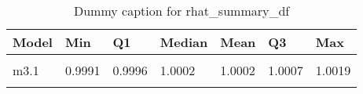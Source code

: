 \begin{table}
\centering
\caption{Dummy caption for rhat_summary_df}
\centering
\fontsize{10}{12}\selectfont
\begin{tabular}[t]{lllllll}
\toprule
Model & Min & Q1 & Median & Mean & Q3 & Max\\
\midrule
\cellcolor{gray!10}{m2} & \cellcolor{gray!10}{0.9991} & \cellcolor{gray!10}{1.0000} & \cellcolor{gray!10}{1.0003} & \cellcolor{gray!10}{1.0008} & \cellcolor{gray!10}{1.0013} & \cellcolor{gray!10}{1.0037}\\
m3.1 & 0.9991 & 0.9996 & 1.0002 & 1.0002 & 1.0007 & 1.0019\\
\cellcolor{gray!10}{m4} & \cellcolor{gray!10}{0.9992} & \cellcolor{gray!10}{0.9998} & \cellcolor{gray!10}{1.0005} & \cellcolor{gray!10}{1.0005} & \cellcolor{gray!10}{1.0011} & \cellcolor{gray!10}{1.0030}\\
\bottomrule
\end{tabular}
\end{table}
